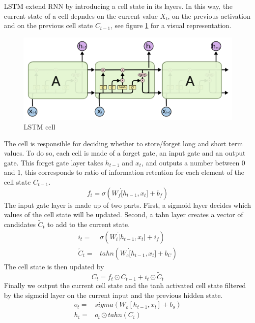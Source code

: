 LSTM extend RNN by introducing a cell state in its layers. In this way, the current state of a cell depndes on the current value $X_t$, on the previous activation and on the previous cell state $C_{t-1}$, see figure \ref{fig:lstm_cell} for a visual representation. 
\begin{figure}[!h]
    \includegraphics[width=\textwidth]{images/lstm_cell.png}
    \caption{LSTM cell}
    \label{fig:lstm_cell}
\end{figure}
The cell is responsible for deciding whether to store/forget long and short term values. To do so, each cell is made of a forget gate, an input gate and an output gate.
This forget gate layer takes $h_{t-1}$ and $x_t$, and outputs a number between 0 and 1, this corresponds to ratio of information retention for each element of the cell state $C_{t-1}$.
\begin{equation}
    f_t=\sigma(W_f\dot[h_{t-1},x_t]+b_f)
\end{equation}
The input gate layer is made up of two parts. First, a sigmoid layer decides which values of the cell state will be updated. Second, a tahn layer creates a vector of candidates $\tilde{C}_t$ to add to the current state.
\begin{equation}
    \begin{aligned}
        i_t=&\sigma(W_i\dot[h_{t-1},x_t]+i_f)
        \\
        \tilde{C}_t=&tahn(W_c\dot[h_{t-1},x_t]+b_C)
    \end{aligned}
\end{equation}
The cell state is then updated by
\begin{equation}
    C_t=f_t\odot C_{t-1}+i_t\odot \tilde{C}_t
\end{equation}
Finally we output the current cell state and the tanh activated cell state filtered by the sigmoid layer on the current input and the previous hidden state.
\begin{equation}
    \begin{aligned}
    o_t=& sigma(W_o[h_{t-1},x_t]+b_o)
    \\
    h_t=& o_t \odot tahn(C_t)
\end{aligned}
\end{equation}


